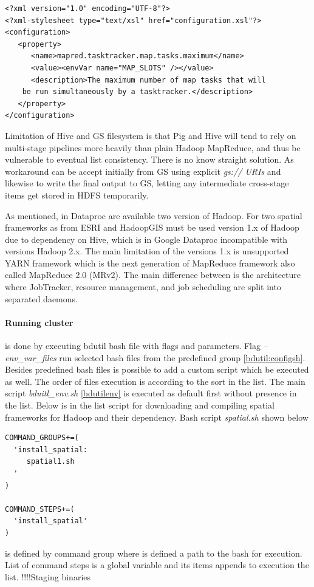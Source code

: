 \documentclass[a4paper,12pt,oneside]{report}
\begin{document}
\begin{footnotesize}
\begin{lstlisting}[style=XML]
<?xml version="1.0" encoding="UTF-8"?>
<?xml-stylesheet type="text/xsl" href="configuration.xsl"?>
<configuration>
   <property>
      <name>mapred.tasktracker.map.tasks.maximum</name>
      <value><envVar name="MAP_SLOTS" /></value>
      <description>The maximum number of map tasks that will 
    be run simultaneously by a tasktracker.</description>
   </property>
</configuration>
\end{lstlisting}
\end{footnotesize}

Limitation of Hive and GS filesystem is that Pig and Hive will tend to rely
on multi-stage pipelines more heavily than plain Hadoop MapReduce, and thus
be vulnerable to eventual list consistency. There is no know straight solution. As workaround can be accept initially from GS
using explicit \textit{gs:// URIs } and likewise to write the final output to GS,
letting any intermediate cross-stage items get stored in HDFS temporarily.


As mentioned, in Dataproc are available two version of Hadoop. For two spatial frameworks as from 
ESRI and HadoopGIS must be used version 1.x of Hadoop due to dependency on Hive, which is in Google 
Dataproc incompatible with versions Hadoop 2.x. The main limitation of the versions 1.x is unsupported 
YARN framework which is the next generation of MapReduce framework also called MapReduce 2.0 (MRv2)\cite{yarn}. 
The main difference between is the architecture where JobTracker, resource management, and job scheduling are split into separated daemons.




	

\paragraph{Running cluster} is done by executing bdutil bash file with flags and parameters.  
Flag \textit{--env\_var\_files} run selected bash files from the predefined group \ref{bdutil:configsh}. 
Besides predefined bash files is possible to add a custom script which be executed as well. The  order 
of files execution is according to the sort in the list. The main script \textit{bduitl\_env.sh} 
\ref{bdutilenv} is executed as default first without presence in the list. Below is in the list script 
for downloading and compiling spatial frameworks for Hadoop and their dependency. Bash script \textit{spatial.sh} shown below 
%
\begin{footnotesize}
\begin{lstlisting}[style=python]
COMMAND_GROUPS+=(
  'install_spatial:
     spatial1.sh
  '
)

COMMAND_STEPS+=(
  'install_spatial'
)
\end{lstlisting}
\end{footnotesize}
is defined by command group where is defined a path to the bash for execution. List of command steps is a
 global variable and its items appends to execution the list.
 !!!!Staging binaries
 
\end{document}
